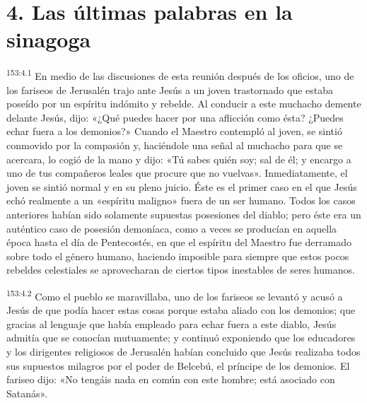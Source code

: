 \section*{4. Las últimas palabras en la sinagoga}
\par 
\textsuperscript{153:4.1} En medio de las discusiones de esta reunión después de los oficios, uno de los fariseos de Jerusalén trajo ante Jesús a un joven trastornado que estaba poseído por un espíritu indómito y rebelde. Al conducir a este muchacho demente delante Jesús, dijo: «¿Qué puedes hacer por una aflicción como ésta? ¿Puedes echar fuera a los demonios?» Cuando el Maestro contempló al joven, se sintió conmovido por la compasión y, haciéndole una señal al muchacho para que se acercara, lo cogió de la mano y dijo: «Tú sabes quién soy; sal de él; y encargo a uno de tus compañeros leales que procure que no vuelvas». Inmediatamente, el joven se sintió normal y en su pleno juicio. Éste es el primer caso en el que Jesús echó realmente a un «espíritu maligno» fuera de un ser humano. Todos los casos anteriores habían sido solamente supuestas posesiones del diablo; pero éste era un auténtico caso de posesión demoníaca, como a veces se producían en aquella época hasta el día de Pentecostés, en que el espíritu del Maestro fue derramado sobre todo el género humano, haciendo imposible para siempre que estos pocos rebeldes celestiales se aprovecharan de ciertos tipos inestables de seres humanos.

\par 
\textsuperscript{153:4.2} Como el pueblo se maravillaba, uno de los fariseos se levantó y acusó a Jesús de que podía hacer estas cosas porque estaba aliado con los demonios; que gracias al lenguaje que había empleado para echar fuera a este diablo, Jesús admitía que se conocían mutuamente; y continuó exponiendo que los educadores y los dirigentes religiosos de Jerusalén habían concluido que Jesús realizaba todos sus supuestos milagros por el poder de Belcebú, el príncipe de los demonios. El fariseo dijo: «No tengáis nada en común con este hombre; está asociado con Satanás».

